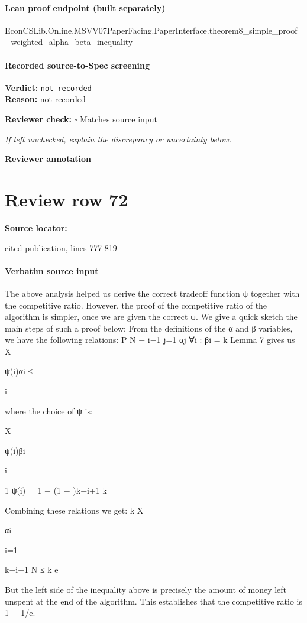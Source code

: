 \documentclass[10pt]{article}
\newcommand{\reviewerbox}{%
  \par\noindent\fbox{\parbox{0.96\linewidth}{\rule{0pt}{0.38in}}}\par
}
\newcommand{\reviewmatch}[1]{%
  \par\noindent\textbf{Reviewer check:} $\square$\; #1\par
  \noindent\emph{If left unchecked, explain the discrepancy or uncertainty below.}\par
}
\begin{document}
\paragraph{Lean proof endpoint (built separately)}\begin{ReviewVerbatim}
EconCSLib.Online.MSVV07PaperFacing.PaperInterface.theorem8_simple_proof_weighted_alpha_beta_inequality
\end{ReviewVerbatim}

\paragraph{Recorded source-to-Spec screening}
\textbf{Verdict:} \texttt{not recorded}
\\
\textbf{Reason:} not recorded
\reviewmatch{Matches source input}
\noindent\textbf{Reviewer annotation}\par
\reviewerbox
\clearpage
\hypertarget{source-claim-bdfc162464f19a98}{}
\section*{Review row 72}
\textbf{Source locator:} {\footnotesize\raggedright cited publication, lines 777-\allowbreak{}819\par}
\paragraph{Verbatim source input}
\begin{ReviewVerbatim}
The above analysis helped us derive the correct tradeoff function ψ together with the competitive ratio. However, the proof of the competitive ratio of the algorithm is simpler, once we
are given the correct ψ. We give a quick sketch the main steps of such a proof below:
From the definitions of the α and β variables, we have the following relations:
P
N − i−1
j=1 αj
∀i : βi =
k
Lemma 7 gives us
X

ψ(i)αi ≤

i

where the choice of ψ is:

X

ψ(i)βi

i

1
ψ(i) = 1 − (1 − )k−i+1
k

Combining these relations we get:
k
X

αi

i=1

k−i+1
N
≤
k
e

But the left side of the inequality above is precisely the amount of money left unspent at the
end of the algorithm. This establishes that the competitive ratio is 1 − 1/e.
\end{ReviewVerbatim}
\end{document}
